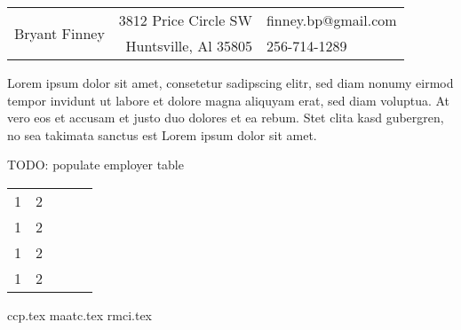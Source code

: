 \documentclass[10pt,a4paper]{article}
\begin{document}
\begin{table}
  \begin{tabularx}{\textwidth}{Xr|l}
    \toprule
    \multirow{2}{*}{\noindent\Huge Bryant Finney} & 3812 Price Circle SW & finney.bp@gmail.com \\
                                   & Huntsville, Al 35805 & 256-714-1289 \\
  \bottomrule
  \end{tabularx}
\end{table}


Lorem ipsum dolor sit amet, consetetur sadipscing elitr, sed diam nonumy eirmod
tempor invidunt ut labore et dolore magna aliquyam erat, sed diam voluptua. At
vero eos et accusam et justo duo dolores et ea rebum. Stet clita kasd gubergren,
no sea takimata sanctus est Lorem ipsum dolor sit amet.

TODO: populate employer table
\begin{table}[h]
  \begin{tabular}{lllll}
    1 &  2         &          &  &  \\
    1 &  2         &          &  &  \\
    1 &  2         &          &  &  \\
    1 &  2         &          &  &
  \end{tabular}
\end{table}

{ccp.tex}
{maatc.tex}
{rmci.tex}
\end{document}
